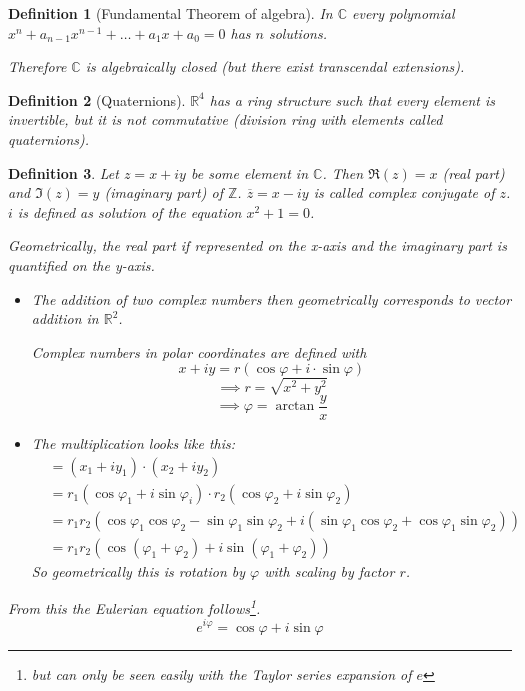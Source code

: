 \documentclass[a4paper,landscape,twocolumn]{article}
\newtheorem{defi}{Definition}[section]
\begin{document}
\begin{defi}[Fundamental Theorem of algebra]
  In $\mathbb C$ every polynomial $x^n + a_{n-1} x^{n-1} + \dots + a_1 x + a_0 = 0$
  has $n$ solutions.

  Therefore $\mathbb C$ is algebraically closed (but there exist transcendal extensions).
\end{defi}

\begin{defi}[Quaternions]
  $\mathbb R^4$ has a ring structure such that every element is invertible,
  but it is not commutative (division ring with elements called \emph{quaternions}).
\end{defi}

\begin{defi}
  Let $z = x + iy$ be some element in $\mathbb C$.
  Then $\Re(z) = x$ (real part) and $\Im(z) = y$ (imaginary part) of $\mathbb Z$.
  $\overline{z} = x - iy$ is called complex conjugate of $z$. $i$ is defined
  as solution of the equation $x^2 + 1 = 0$.

  Geometrically, the real part if represented on the x-axis and the imaginary part
  is quantified on the y-axis.

  \begin{itemize}
    \item
      The addition of two complex numbers then geometrically corresponds to
      vector addition in $\mathbb R^2$.

      Complex numbers in polar coordinates are defined with
      \[ x + iy = r(\cos{\varphi} + i \cdot \sin{\varphi}) \]
      \[ \implies r = \sqrt{x^2 + y^2} \]
      \[ \implies \varphi = \arctan{\frac yx} \]
    \item The multiplication looks like this:
      \begin{align*}
        &= (x_1 + i y_1) \cdot (x_2 + i y_2) \\
        &= r_1 (\cos{\varphi_1} + i \sin{\varphi_i}) \cdot r_2 (\cos{\varphi_2} + i \sin{\varphi_2}) \\
        &= r_1 r_2 (\cos{\varphi_1} \cos{\varphi_2} - \sin{\varphi_1} \sin{\varphi_2} + i (\sin{\varphi_1} \cos{\varphi_2} + \cos{\varphi_1} \sin{\varphi_2})) \\
        &= r_1 r_2 (\cos{(\varphi_1 + \varphi_2)} + i \sin{(\varphi_1 + \varphi_2)})
      \end{align*}
      So geometrically this is rotation by $\varphi$ with scaling by factor $r$.
  \end{itemize}

  From this the Eulerian equation follows\footnote{but can only be seen easily with the Taylor series expansion of $e$}.
  \[ e^{i \varphi} = \cos{\varphi} + i \sin\varphi \]
\end{defi}
\end{document}
